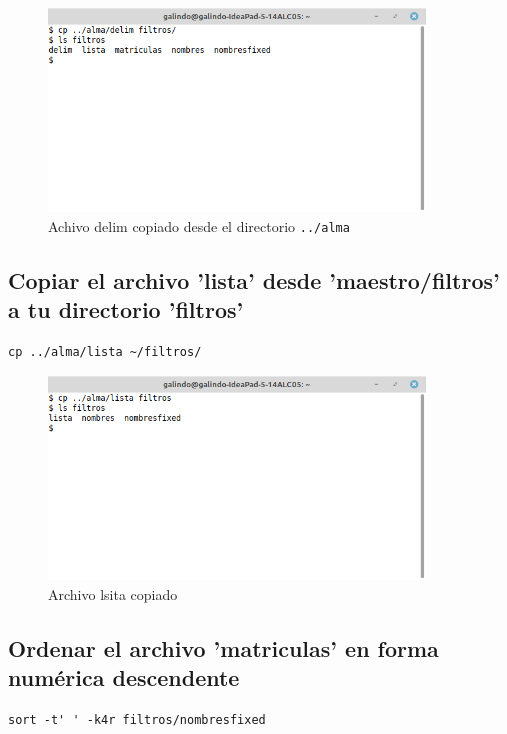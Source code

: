 \documentclass[11pt]{article}
\begin{document}
\begin{figure}[htbp]
\centering
\includegraphics[width=10cm]{img/a10.png}
\caption[\texttt{../alma}]{Achivo delim copiado desde el directorio \texttt{../alma}}
\end{figure}

\subsection{Copiar el archivo 'lista' desde 'maestro/filtros' a tu directorio 'filtros'}
\label{sec:org2008b44}
\begin{verbatim}
cp ../alma/lista ~/filtros/
\end{verbatim}

\begin{figure}[htbp]
\centering
\includegraphics[width=10cm]{img/a11.png}
\caption{Archivo lsita copiado}
\end{figure}

\subsection{Ordenar el archivo 'matriculas' en forma numérica descendente}
\label{sec:org110e58d}
\begin{verbatim}
sort -t' ' -k4r filtros/nombresfixed
\end{verbatim}
\end{document}
